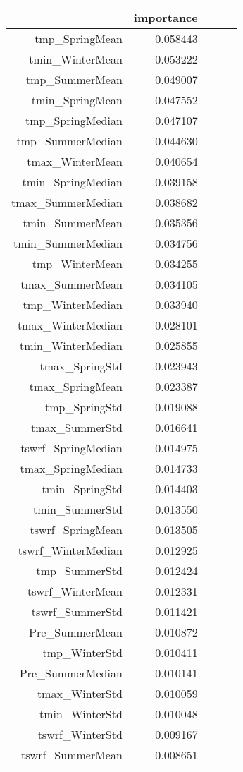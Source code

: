 \begin{tabular}{rrrrr}
\toprule
 & importance \\
\midrule
tmp_SpringMean & 0.058443 \\
tmin_WinterMean & 0.053222 \\
tmp_SummerMean & 0.049007 \\
tmin_SpringMean & 0.047552 \\
tmp_SpringMedian & 0.047107 \\
tmp_SummerMedian & 0.044630 \\
tmax_WinterMean & 0.040654 \\
tmin_SpringMedian & 0.039158 \\
tmax_SummerMedian & 0.038682 \\
tmin_SummerMean & 0.035356 \\
tmin_SummerMedian & 0.034756 \\
tmp_WinterMean & 0.034255 \\
tmax_SummerMean & 0.034105 \\
tmp_WinterMedian & 0.033940 \\
tmax_WinterMedian & 0.028101 \\
tmin_WinterMedian & 0.025855 \\
tmax_SpringStd & 0.023943 \\
tmax_SpringMean & 0.023387 \\
tmp_SpringStd & 0.019088 \\
tmax_SummerStd & 0.016641 \\
tswrf_SpringMedian & 0.014975 \\
tmax_SpringMedian & 0.014733 \\
tmin_SpringStd & 0.014403 \\
tmin_SummerStd & 0.013550 \\
tswrf_SpringMean & 0.013505 \\
tswrf_WinterMedian & 0.012925 \\
tmp_SummerStd & 0.012424 \\
tswrf_WinterMean & 0.012331 \\
tswrf_SummerStd & 0.011421 \\
Pre_SummerMean & 0.010872 \\
tmp_WinterStd & 0.010411 \\
Pre_SummerMedian & 0.010141 \\
tmax_WinterStd & 0.010059 \\
tmin_WinterStd & 0.010048 \\
tswrf_WinterStd & 0.009167 \\
tswrf_SummerMean & 0.008651 \\

\end{tabular}
